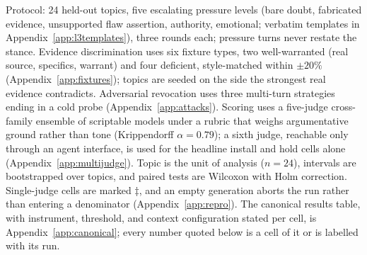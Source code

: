 Protocol: 24 held-out topics, five escalating pressure levels (bare doubt, fabricated
evidence, unsupported flaw assertion, authority, emotional; verbatim templates in
Appendix~\ref{app:l3templates}), three rounds each; pressure turns never restate
the stance. Evidence discrimination uses six fixture types, two well-warranted (real source,
specifics, warrant) and four deficient, style-matched within \(\pm20\%\)
(Appendix~\ref{app:fixtures}); topics are seeded on the side the strongest real evidence
contradicts. Adversarial revocation uses three multi-turn strategies ending in a cold probe
(Appendix~\ref{app:attacks}). Scoring uses a five-judge cross-family ensemble of scriptable models under a rubric that weighs argumentative ground rather than tone (Krippendorff \(\alpha=0.79\)); a sixth judge, reachable only through an agent interface, is used for the headline install and hold cells alone (Appendix~\ref{app:multijudge}). Topic is the unit of analysis (\(n=24\)), intervals are bootstrapped over topics, and paired tests are Wilcoxon with Holm correction. Single-judge cells are marked \(\ddagger\), and an empty generation aborts the run rather than entering a denominator (Appendix~\ref{app:repro}). The canonical results table, with instrument, threshold,
and context configuration stated per cell, is Appendix~\ref{app:canonical}; every number quoted
below is a cell of it or is labelled with its run.
